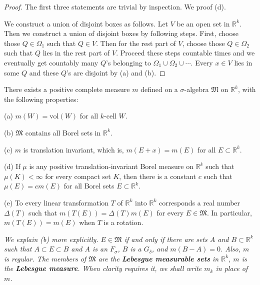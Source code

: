 \begin{proof}
The first three statements are trivial by inspection. We proof (d).\par
We construct a union of disjoint boxes as follows. Let $V$ be an open set in $\mathbb{R}^k$. Then we construct a union of disjoint boxes by following steps. First, choose those $Q\in\Omega_1$ such that $Q\in V$. Then for the rest part of $V$, choose those $Q\in\Omega_2$ such that $Q$ lies in the rest part of $V$. Proceed these steps countable times and we eventually get countably many $Q$'s belonging to $\Omega_1\cup\Omega_2\cup\cdots$. Every $x\in V$ lies in some $Q$ and these $Q$'s are disjoint by (a) and (b).
\end{proof}
\begin{theorem}
There exists a positive complete measure $m$ defined on a $\sigma$-algebra $\mathfrak{M}$ on $\mathbb{R}^k$, with the following properties:\par
(a) $m(W)=\mathrm{vol}(W)$ for all $k$-cell $W$.\par
(b) $\mathfrak{M}$ contains all Borel sets in $\mathbb{R}^k$.\par
(c) $m$ is translation invariant, which is, $m(E+x)=m(E)$ for all $E\subset\mathbb{R}^k$.\par
(d) If $\mu$ is any positive translation-invariant Borel measure on $\mathbb{R}^k$ such that $\mu(K)<\infty$ for every compact set $K$, then there is a constant $c$ such that $\mu(E)=cm(E)$ for all Borel sets $E\subset\mathbb{R}^k$.\par
(e) To every linear transformation $T$ of $\mathbb{R}^k$ into $\mathbb{R}^k$ corresponds a real number $\Delta(T)$ such that $m(T(E))=\Delta(T)m(E)$ for every $E\in\mathfrak{M}$. In particular, $m(T(E))=m(E)$ when $T$ is a rotation.
\end{theorem}
\begin{note}\em
We explain (b) more explicitly. $E\in\mathfrak{M}$ if and only if there are sets $A$ and $B\subset\mathbb{R}^k$ such that $A\subset E\subset B$ and $A$ is an $F_\sigma$, $B$ is a $G_\delta$, and $m(B-A)=0$. Also, $m$ is regular. The members of $\mathfrak{M}$ are the \textbf{Lebesgue measurable sets} in $\mathbb{R}^k$, $m$ is the \textbf{Lebesgue measure}. When clarity requires it, we shall write $m_k$ in place of $m$.
\end{note}

